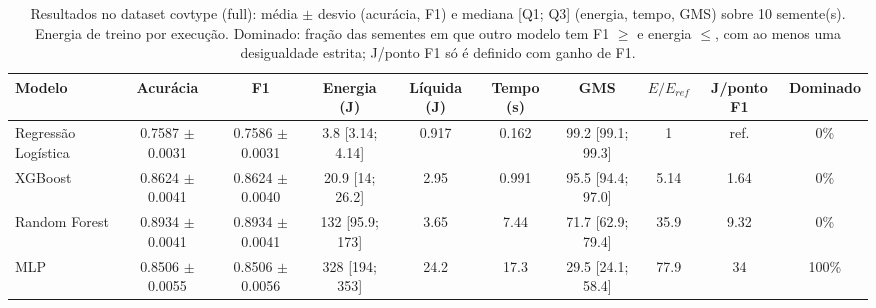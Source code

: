 \begin{table}[htbp]
\centering
\small
\caption{Resultados no dataset covtype (full): média $\pm$ desvio (acurácia, F1) e mediana [Q1; Q3] (energia, tempo, GMS) sobre 10 semente(s). Energia de treino por execução. Dominado: fração das sementes em que outro modelo tem F1 $\geq$ e energia $\leq$, com ao menos uma desigualdade estrita; J/ponto F1 só é definido com ganho de F1.}
\label{tab:resultados_covtype_full}
\begin{tabular}{lccccccccc}
\toprule
\textbf{Modelo} & \textbf{Acurácia} & \textbf{F1} & \textbf{Energia (J)} & \textbf{Líquida (J)} & \textbf{Tempo (s)} & \textbf{GMS} & \textbf{$E/E_{ref}$} & \textbf{J/ponto F1} & \textbf{Dominado} \\
\midrule
Regressão Logística & 0.7587 $\pm$ 0.0031 & 0.7586 $\pm$ 0.0031 & 3.8 [3.14; 4.14] & 0.917 & 0.162 & 99.2 [99.1; 99.3] & 1 & ref. & 0\% \\
XGBoost & 0.8624 $\pm$ 0.0041 & 0.8624 $\pm$ 0.0040 & 20.9 [14; 26.2] & 2.95 & 0.991 & 95.5 [94.4; 97.0] & 5.14 & 1.64 & 0\% \\
Random Forest & 0.8934 $\pm$ 0.0041 & 0.8934 $\pm$ 0.0041 & 132 [95.9; 173] & 3.65 & 7.44 & 71.7 [62.9; 79.4] & 35.9 & 9.32 & 0\% \\
MLP & 0.8506 $\pm$ 0.0055 & 0.8506 $\pm$ 0.0056 & 328 [194; 353] & 24.2 & 17.3 & 29.5 [24.1; 58.4] & 77.9 & 34 & 100\% \\
\bottomrule
\end{tabular}
\end{table}
